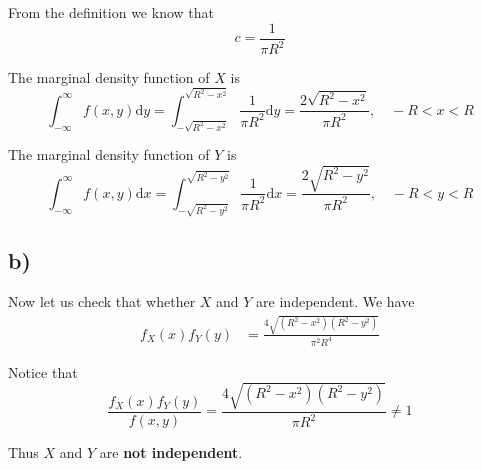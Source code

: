 \documentclass[a4paper, UTF-8]{article}
\theoremstyle{plain}
\begin{document}
From the definition we know that 
$$
c = \frac{1}{\pi R^2}
$$

The marginal density function of $X$ is
$$
\int_{-\infty}^{\infty} f(x, y) \mathrm{d}y = \int_{-\sqrt{R^2 - x^2}}^{\sqrt{R^2 - x^2}} \frac{1}{\pi R^2} \mathrm{d}y = \frac{2\sqrt{R^2 - x^2}}{\pi R^2}, \quad -R < x < R
$$

The marginal density function of $Y$ is
$$
\int_{-\infty}^{\infty} f(x, y) \mathrm{d}x = \int_{-\sqrt{R^2 - y^2}}^{\sqrt{R^2 - y^2}} \frac{1}{\pi R^2} \mathrm{d}x = \frac{2\sqrt{R^2 - y^2}}{\pi R^2}, \quad -R < y < R
$$

\subsection{b)} 

Now let us check that whether $X$ and $Y$ are independent. We have
\begin{align*}
f_X(x)f_Y(y) &= \frac{4\sqrt{(R^2 - x^2)(R^2 - y^2)}}{\pi^2 R^4}
\end{align*}

Notice that 
$$
\frac{f_X(x)f_Y(y)}{f(x,y)} = \frac{4\sqrt{(R^2 - x^2)(R^2 - y^2)}}{\pi R^2} \neq 1
$$

Thus $X$ and $Y$ are \textbf{not independent}.
\end{document}
